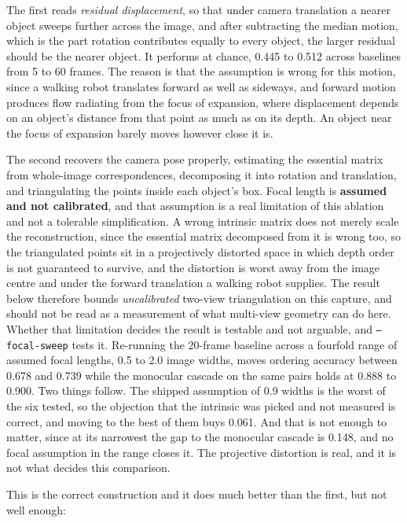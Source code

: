 The first reads \textit{residual displacement}, so that under camera translation a nearer object sweeps further across the image, and after subtracting the median motion, which is the part rotation contributes equally to every object, the larger residual should be the nearer object. It performs at chance, 0.445 to 0.512 across baselines from 5 to 60 frames. The reason is that the assumption is wrong for this motion, since a walking robot translates forward as well as sideways, and forward motion produces flow radiating from the focus of expansion, where displacement depends on an object's distance from that point as much as on its depth. An object near the focus of expansion barely moves however close it is.

The second recovers the camera pose properly, estimating the essential matrix from whole-image correspondences, decomposing it into rotation and translation, and triangulating the points inside each object's box. Focal length is \textbf{assumed and not calibrated}, and that assumption is a real limitation of this ablation and not a tolerable simplification. A wrong intrinsic matrix does not merely scale the reconstruction, since the essential matrix decomposed from it is wrong too, so the triangulated points sit in a projectively distorted space in which depth order is not guaranteed to survive, and the distortion is worst away from the image centre and under the forward translation a walking robot supplies. The result below therefore bounds \textit{uncalibrated} two-view triangulation on this capture, and should not be read as a measurement of what multi-view geometry can do here. Whether that limitation decides the result is testable and not arguable, and \texttt{--focal-sweep} tests it. Re-running the 20-frame baseline across a fourfold range of assumed focal lengths, 0.5 to 2.0 image widths, moves ordering accuracy between 0.678 and 0.739 while the monocular cascade on the same pairs holds at 0.888 to 0.900. Two things follow. The shipped assumption of 0.9 widths is the worst of the six tested, so the objection that the intrinsic was picked and not measured is correct, and moving to the best of them buys 0.061. And that is not enough to matter, since at its narrowest the gap to the monocular cascade is 0.148, and no focal assumption in the range closes it. The projective distortion is real, and it is not what decides this comparison.

This is the correct construction and it does much better than the first, but not well enough:

